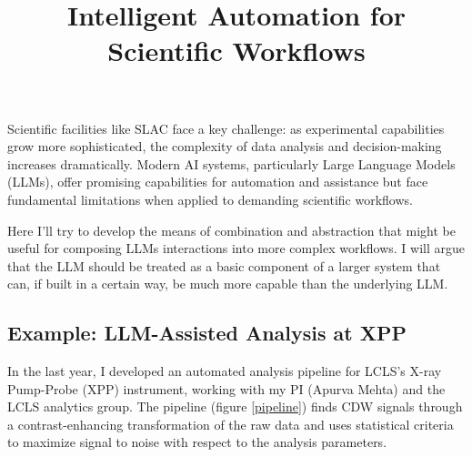 \documentclass{article}
\title{Intelligent Automation for Scientific Workflows}
\date{}
\begin{document}
\maketitle


Scientific facilities like SLAC face a key challenge: as experimental capabilities grow more sophisticated, the complexity of data analysis and decision-making increases dramatically. Modern AI systems, particularly Large Language Models (LLMs), offer promising capabilities for automation and assistance but face fundamental limitations when applied to demanding scientific workflows.

Here I'll try to develop the means of combination and abstraction that might be useful for composing LLMs interactions into more complex workflows. I will argue that the LLM should be treated as a basic component of a larger system that can, if built in a certain way, be much more capable than the underlying LLM. 

%

\subsection{Example: LLM-Assisted Analysis at XPP}
In the last year, I developed an automated analysis pipeline for LCLS's X-ray Pump-Probe (XPP) instrument, working with my PI (Apurva Mehta) and the LCLS analytics group. The pipeline (figure \ref{pipeline}) finds CDW signals through a contrast-enhancing transformation of the raw data and uses statistical criteria to maximize signal to noise with respect to the analysis parameters.
\end{document}
